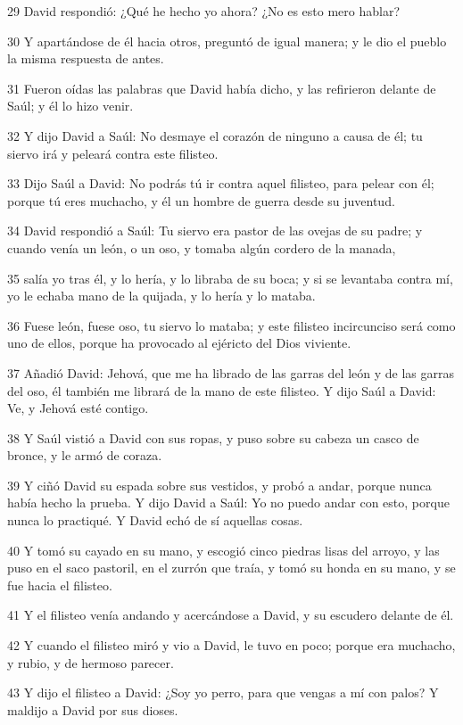 \par 29 David respondió: ¿Qué he hecho yo ahora? ¿No es esto mero hablar?
\par 30 Y apartándose de él hacia otros, preguntó de igual manera; y le dio el pueblo la misma respuesta de antes.
\par 31 Fueron oídas las palabras que David había dicho, y las refirieron delante de Saúl; y él lo hizo venir.
\par 32 Y dijo David a Saúl: No desmaye el corazón de ninguno a causa de él; tu siervo irá y peleará contra este filisteo.
\par 33 Dijo Saúl a David: No podrás tú ir contra aquel filisteo, para pelear con él; porque tú eres muchacho, y él un hombre de guerra desde su juventud.
\par 34 David respondió a Saúl: Tu siervo era pastor de las ovejas de su padre; y cuando venía un león, o un oso, y tomaba algún cordero de la manada,
\par 35 salía yo tras él, y lo hería, y lo libraba de su boca; y si se levantaba contra mí, yo le echaba mano de la quijada, y lo hería y lo mataba.
\par 36 Fuese león, fuese oso, tu siervo lo mataba; y este filisteo incircunciso será como uno de ellos, porque ha provocado al ejéricto del Dios viviente.
\par 37 Añadió David: Jehová, que me ha librado de las garras del león y de las garras del oso, él también me librará de la mano de este filisteo. Y dijo Saúl a David: Ve, y Jehová esté contigo.
\par 38 Y Saúl vistió a David con sus ropas, y puso sobre su cabeza un casco de bronce, y le armó de coraza.
\par 39 Y ciñó David su espada sobre sus vestidos, y probó a andar, porque nunca había hecho la prueba. Y dijo David a Saúl: Yo no puedo andar con esto, porque nunca lo practiqué. Y David echó de sí aquellas cosas.
\par 40 Y tomó su cayado en su mano, y escogió cinco piedras lisas del arroyo, y las puso en el saco pastoril, en el zurrón que traía, y tomó su honda en su mano, y se fue hacia el filisteo.
\par 41 Y el filisteo venía andando y acercándose a David, y su escudero delante de él.
\par 42 Y cuando el filisteo miró y vio a David, le tuvo en poco; porque era muchacho, y rubio, y de hermoso parecer.
\par 43 Y dijo el filisteo a David: ¿Soy yo perro, para que vengas a mí con palos? Y maldijo a David por sus dioses.
